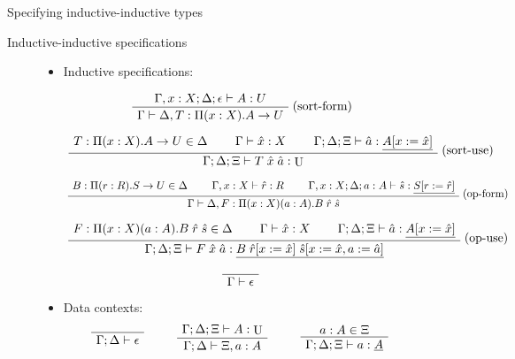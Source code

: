 \documentclass[acmsmall,review]{acmart}\settopmatter{printfolios=true,printccs=false,printacmref=false}
\newenvironment{bprooftree}
  {\leavevmode\hbox\bgroup}
  {\DisplayProof\egroup}
\DeclareMathOperator{\UU}{U}
\newcommand{\tac}{\vdash}
\begin{document}
\begin{section}{Specifying inductive-inductive types}
\begin{subsection}{Inductive-inductive specifications}
\begin{figure}[htpb]
    \begin{itemize}
        \item Inductive specifications: \hfill \boxed{\Gamma \tac \Delta}
        
        \[\begin{bprooftree}
            \AxiomC{$\Gamma , x : X ; \Delta ; \epsilon \tac A : U$}\UnaryInfC{$\Gamma \tac \Delta , T : \Pi(x:X).A\to U$}
        \end{bprooftree}\text{(sort-form)}\]
        
        \[\begin{bprooftree}
            \AxiomC{$T : \Pi(x : X).A \to U \in \Delta$}\AxiomC{$\Gamma \tac \hat{x} : X$}\AxiomC{$\Gamma ; \Delta ; \Xi \tac \hat{a} : \underline{A[x:=\hat{x}]}$}\TrinaryInfC{$\Gamma ; \Delta ; \Xi \tac T\;\hat{x}\;\hat{a} : \UU$}
        \end{bprooftree}\text{(sort-use)}\]
        
        \[\begin{bprooftree}
            \AxiomC{$B : \Pi(r : R).S\to U  \in \Delta$}\AxiomC{$\Gamma , x : X \tac \hat{r} : R$}\AxiomC{$\Gamma , x : X ; \Delta ; a : A \tac \hat{s} : \underline{S[r:=\hat{r}]}$}\TrinaryInfC{$\Gamma \tac \Delta , F : \Pi(x : X)(a : A).B\;\hat{r}\;\hat{s}$}
        \end{bprooftree}\text{(op-form)}\]
        
        \[\begin{bprooftree}
            \AxiomC{$F : \Pi(x : X)(a : A).B\;\hat{r}\;\hat{s} \in \Delta$}\AxiomC{$\Gamma \tac \hat{x} : X$}\AxiomC{$\Gamma ; \Delta ; \Xi \tac \hat{a} : \underline{A[x:=\hat{x}]}$}\TrinaryInfC{$\Gamma ; \Delta ; \Xi \tac F\;\hat{x}\;\hat{a} : \underline{B\;\hat{r}[x := \hat{x}]\;\hat{s}[x := \hat{x}, a := \hat{a}]}$}
        \end{bprooftree}\text{(op-use)}\]
        
        \[\begin{bprooftree}
                \AxiomC{}\UnaryInfC{$\Gamma\tac \epsilon$}
        \end{bprooftree}\]

        \item Data contexts: \hfill \boxed{\Gamma ; \Delta \tac \Xi}
        \[
            \begin{bprooftree}
                \AxiomC{}\UnaryInfC{$\Gamma ; \Delta \tac \epsilon$}
            \end{bprooftree}
            \qquad
            \begin{bprooftree}
                \AxiomC{$\Gamma ; \Delta ; \Xi \tac A : \UU$}\UnaryInfC{$\Gamma ; \Delta \tac \Xi , a : A$}
            \end{bprooftree}
            \qquad
            \begin{bprooftree}
                \AxiomC{$a : A \in \Xi$}\UnaryInfC{$\Gamma ; \Delta ; \Xi \tac a : \underline{A}$}
            \end{bprooftree}
        \]


\end{itemize}
\end{figure}
\end{subsection}
\end{section}
\end{document}
